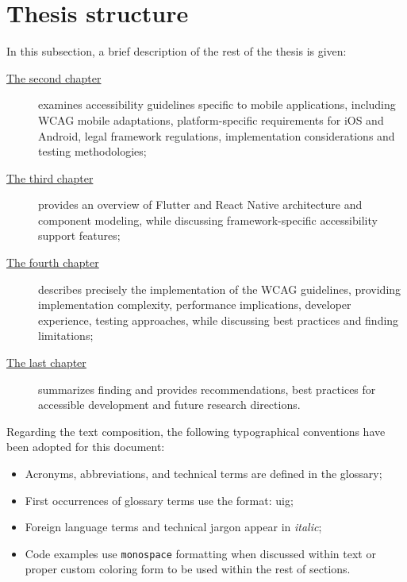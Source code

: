 \section{Thesis structure}
\label{chap:intro-structure} 

In this subsection, a brief description of the rest of the thesis is given:

\begin{description}
    \item[{\hyperref[chap:accessibility]{The second chapter}}]  examines accessibility guidelines specific to mobile applications, including WCAG mobile adaptations, platform-specific requirements for iOS and Android, legal framework regulations, implementation considerations and testing methodologies;
    
    \item[{\hyperref[chap:frameworks]{The third chapter}}] provides an overview of Flutter and React Native architecture and component modeling, while discussing framework-specific accessibility support features;
    
    \item[{\hyperref[chap:implementation]{The fourth chapter}}] describes precisely the implementation of the WCAG guidelines, providing implementation complexity, performance implications, developer experience, testing approaches, while discussing best practices and finding limitations;
    
    \item[{\hyperref[chap:conclusions]{The last chapter}}] summarizes finding and provides recommendations, best practices for accessible development and future research directions.
\end{description}

Regarding the text composition, the following typographical conventions have been adopted for this document:
\begin{itemize}
    \item Acronyms, abbreviations, and technical terms are defined in the glossary;
    \item First occurrences of glossary terms use the format: \gls{uig};
    \item Foreign language terms and technical jargon appear in \textit{italic};
    \item Code examples use \texttt{monospace} formatting when discussed within text or proper custom coloring form to be used within the rest of sections.
\end{itemize}

\newpage